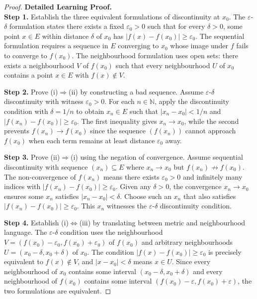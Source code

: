 \begin{proof}
\textbf{Detailed Learning Proof.}~\\

\textbf{Step 1.} Establish the three equivalent formulations of discontinuity at $x_0$.
The $\varepsilon$-$\delta$ formulation states there exists a fixed $\varepsilon_0>0$ such that for every $\delta>0$, some point $x \in E$ within distance $\delta$ of $x_0$ has $|f(x)-f(x_0)|\ge \varepsilon_0$. The sequential formulation requires a sequence in $E$ converging to $x_0$ whose image under $f$ fails to converge to $f(x_0)$. The neighbourhood formulation uses open sets: there exists a neighbourhood $V$ of $f(x_0)$ such that every neighbourhood $U$ of $x_0$ contains a point $x \in E$ with $f(x)\notin V$.

\textbf{Step 2.} Prove (i)$\Rightarrow$(ii) by constructing a bad sequence.
Assume $\varepsilon$-$\delta$ discontinuity with witness $\varepsilon_0>0$. For each $n \in \mathbb{N}$, apply the discontinuity condition with $\delta=1/n$ to obtain $x_n \in E$ such that $|x_n-x_0|<1/n$ and $|f(x_n)-f(x_0)|\ge \varepsilon_0$. The first inequality gives $x_n\to x_0$, while the second prevents $f(x_n)\to f(x_0)$ since the sequence $(f(x_n))$ cannot approach $f(x_0)$ when each term remains at least distance $\varepsilon_0$ away.

\textbf{Step 3.} Prove (ii)$\Rightarrow$(i) using the negation of convergence.
Assume sequential discontinuity with sequence $(x_n) \subseteq E$ where $x_n\to x_0$ but $f(x_n)\not\to f(x_0)$. The non-convergence of $f(x_n)$ means there exists $\varepsilon_0>0$ and infinitely many indices with $|f(x_n)-f(x_0)|\ge \varepsilon_0$. Given any $\delta>0$, the convergence $x_n\to x_0$ ensures some $x_n$ satisfies $|x_n-x_0|<\delta$. Choose such an $x_n$ that also satisfies $|f(x_n)-f(x_0)|\ge \varepsilon_0$. This $x_n$ witnesses the $\varepsilon$-$\delta$ discontinuity condition.

\textbf{Step 4.} Establish (i)$\Leftrightarrow$(iii) by translating between metric and neighbourhood language.
The $\varepsilon$-$\delta$ condition uses the neighbourhood $V=(f(x_0)-\varepsilon_0, f(x_0)+\varepsilon_0)$ of $f(x_0)$ and arbitrary neighbourhoods $U=(x_0-\delta, x_0+\delta)$ of $x_0$. The condition $|f(x)-f(x_0)|\ge \varepsilon_0$ is precisely equivalent to $f(x)\notin V$, and $|x-x_0|<\delta$ means $x \in U$. Since every neighbourhood of $x_0$ contains some interval $(x_0-\delta, x_0+\delta)$ and every neighbourhood of $f(x_0)$ contains some interval $(f(x_0)-\varepsilon, f(x_0)+\varepsilon)$, the two formulations are equivalent.
\end{proof}

